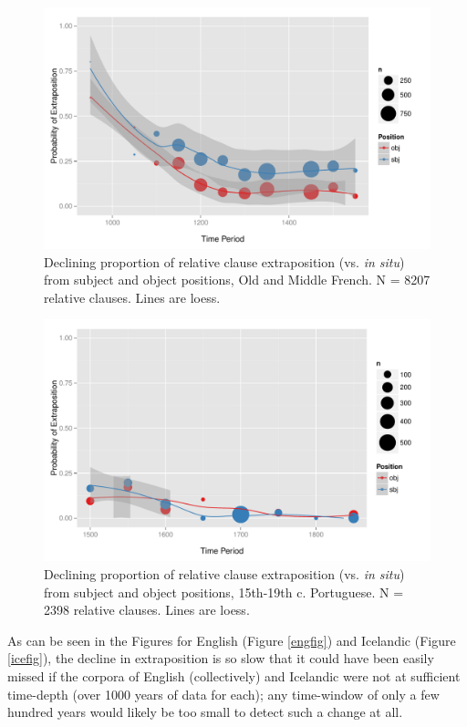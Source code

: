 \begin{figure}
  \includegraphics[width=1.1\textwidth]{stableVarTalks/exSbjObjYearBinned50Loessfre.pdf}
\caption{Declining proportion of relative clause extraposition (vs. \textsl{in situ}) from subject and object positions, Old and Middle French. N = 8207 relative clauses. Lines are loess.}
\label{frefig}       
\end{figure}

\begin{figure}
  \includegraphics[width=1.1\textwidth]{stableVarTalks/exSbjObjYearBinned50Loessport.pdf}
\caption{Declining proportion of relative clause extraposition (vs. \textsl{in situ}) from subject and object positions, 15th-19th c. Portuguese. N = 2398 relative clauses. Lines are loess.}
\label{portfig}       
\end{figure}



As can be seen in the Figures for English (Figure \ref{engfig}) and Icelandic (Figure \ref{icefig}), the decline in extraposition is so slow that it could have been easily missed if the corpora of English (collectively) and Icelandic were not at sufficient time-depth (over 1000 years of data for each); any time-window of only a few hundred years would likely be too small to detect such a change at all.

